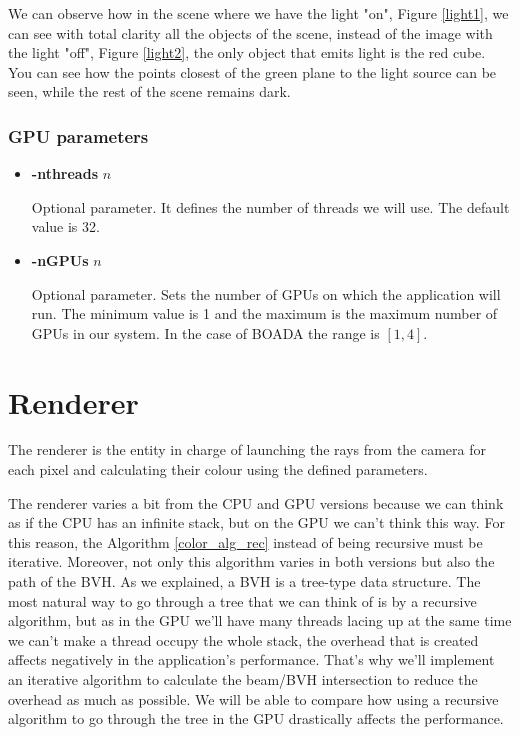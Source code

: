 \documentclass[titlepage,12pt]{report}
\begin{document}
\begin{itemize}
We can observe how in the scene where we have the light "on", Figure \ref{light1}, we can see with total clarity all the objects of the scene, instead of the image with the light "off", Figure \ref{light2}, the only object that emits light is the red cube. You can see how the points closest of the green plane to the light source can be seen, while the rest of the scene remains dark.

\end{itemize}

\subsubsection{GPU parameters}

\begin{itemize}

\item \textbf{-nthreads} $n$

Optional parameter. It defines the number of threads we will use. The default value is 32.

\item \textbf{-nGPUs} $n$

Optional parameter. Sets the number of GPUs on which the application will run. The minimum value is 1 and the maximum is the maximum number of GPUs in our system. In the case of BOADA the range is $[1,4]$.


\end{itemize}

\section{Renderer}

The renderer is the entity in charge of launching the rays from the camera for each pixel and calculating their colour using the defined parameters.

The renderer varies a bit from the CPU and GPU versions because we can think as if the CPU has an infinite stack, but on the GPU we can't think this way. For this reason, the Algorithm \ref{color_alg_rec} instead of being recursive must be iterative. Moreover, not only this algorithm varies in both versions but also the path of the BVH. As we explained, a BVH is a tree-type data structure. The most natural way to go through a tree that we can think of is by a recursive algorithm, but as in the GPU we'll have many threads lacing up at the same time we can't make a thread occupy the whole stack, the overhead that is created affects negatively in the application's performance. That's why we'll implement an iterative algorithm to calculate the beam/BVH intersection to reduce the overhead as much as possible. We will be able to compare how using a recursive algorithm to go through the tree in the GPU drastically affects the performance.
\end{document}
